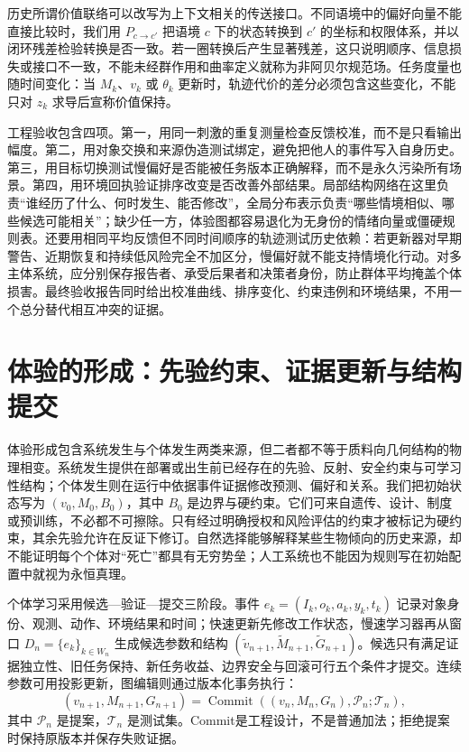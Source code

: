 历史所谓价值联络可以改写为上下文相关的传送接口。不同语境中的偏好向量不能直接比较时，我们用 $P_{c\to c'}$ 把语境 $c$ 下的状态转换到 $c'$ 的坐标和权限体系，并以闭环残差检验转换是否一致。若一圈转换后产生显著残差，这只说明顺序、信息损失或接口不一致，不能未经群作用和曲率定义就称为非阿贝尔规范场。任务度量也随时间变化：当 $M_k$、$v_k$ 或 $\theta_k$ 更新时，轨迹代价的差分必须包含这些变化，不能只对 $z_k$ 求导后宣称价值保持。

工程验收包含四项。第一，用同一刺激的重复测量检查反馈校准，而不是只看输出幅度。第二，用对象交换和来源伪造测试绑定，避免把他人的事件写入自身历史。第三，用目标切换测试慢偏好是否能被任务版本正确解释，而不是永久污染所有场景。第四，用环境回执验证排序改变是否改善外部结果。局部结构网络在这里负责“谁经历了什么、何时发生、能否修改”，全局分布表示负责“哪些情境相似、哪些候选可能相关”；缺少任一方，体验图都容易退化为无身份的情绪向量或僵硬规则表。还要用相同平均反馈但不同时间顺序的轨迹测试历史依赖：若更新器对早期警告、近期恢复和持续低风险完全不加区分，慢偏好就不能支持情境化行动。对多主体系统，应分别保存报告者、承受后果者和决策者身份，防止群体平均掩盖个体损害。最终验收报告同时给出校准曲线、排序变化、约束违例和环境结果，不用一个总分替代相互冲突的证据。

\section{体验的形成：先验约束、证据更新与结构提交}
\label{sec:section_6973}
体验形成包含系统发生与个体发生两类来源，但二者都不等于质料向几何结构的物理相变。系统发生提供在部署或出生前已经存在的先验、反射、安全约束与可学习性结构；个体发生则在运行中依据事件证据修改预测、偏好和关系。我们把初始状态写为 $(v_0,M_0,B_0)$，其中 $B_0$ 是边界与硬约束。它们可来自遗传、设计、制度或预训练，不必都不可擦除。只有经过明确授权和风险评估的约束才被标记为硬约束，其余先验允许在反证下修订。自然选择能够解释某些生物倾向的历史来源，却不能证明每个个体对“死亡”都具有无穷势垒；人工系统也不能因为规则写在初始配置中就视为永恒真理。

个体学习采用候选—验证—提交三阶段。事件 $e_k=(I_k,o_k,a_k,y_k,t_k)$ 记录对象身份、观测、动作、环境结果和时间；快速更新先修改工作状态，慢速学习器再从窗口 $D_n=\{e_k\}_{k\in W_n}$ 生成候选参数和结构 $(\tilde v_{n+1},\tilde M_{n+1},\tilde G_{n+1})$。候选只有满足证据独立性、旧任务保持、新任务收益、边界安全与回滚可行五个条件才提交。连续参数可用投影更新，图编辑则通过版本化事务执行：
\[
(v_{n+1},M_{n+1},G_{n+1})=
\operatorname{Commit}\!\left((v_n,M_n,G_n),\mathcal P_n;\mathcal T_n\right),
\]
其中 $\mathcal P_n$ 是提案，$\mathcal T_n$ 是测试集。Commit是工程设计，不是普通加法；拒绝提案时保持原版本并保存失败证据。

